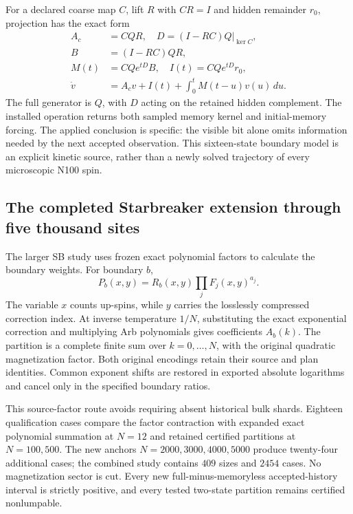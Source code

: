 For a declared coarse map $C$, lift $R$ with $CR=I$ and hidden remainder $r_0$, projection has the exact form
\[
 \begin{aligned}
 A_c&=CQR,\quad D=(I-RC)Q|_{\ker C},\\
 B&=(I-RC)QR,\\
 M(t)&=CQe^{tD}B,\quad I(t)=CQe^{tD}r_0,\\
 \dot v&=A_cv+I(t)+\int_0^tM(t-u)v(u)\,du.
 \end{aligned}
\]
The full generator is $Q$, with $D$ acting on the retained hidden complement. The installed operation returns both sampled memory kernel and initial-memory forcing. The applied conclusion is specific: the visible bit alone omits information needed by the next accepted observation. This sixteen-state boundary model is an explicit kinetic source, rather than a newly solved trajectory of every microscopic N100 spin.

\subsection{The completed Starbreaker extension through five thousand sites}

The larger SB study uses frozen exact polynomial factors to calculate the boundary weights. For boundary $b$,
\[
 P_b(x,y)=R_b(x,y)\prod_jF_j(x,y)^{a_j}.
\]
The variable $x$ counts up-spins, while $y$ carries the losslessly compressed correction index. At inverse temperature $1/N$, substituting the exact exponential correction and multiplying Arb polynomials gives coefficients $A_b(k)$. The partition is a complete finite sum over $k=0,\ldots,N$, with the original quadratic magnetization factor. Both original encodings retain their source and plan identities. Common exponent shifts are restored in exported absolute logarithms and cancel only in the specified boundary ratios. 

This source-factor route avoids requiring absent historical bulk shards. Eighteen qualification cases compare the factor contraction with expanded exact polynomial summation at $N=12$ and retained certified partitions at $N=100,500$. The new anchors $N=2000,3000,4000,5000$ produce twenty-four additional cases; the combined study contains $409$ sizes and $2454$ cases. No magnetization sector is cut. Every new full-minus-memoryless accepted-history interval is strictly positive, and every tested two-state partition remains certified nonlumpable.

